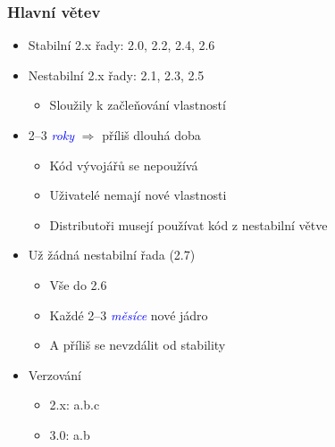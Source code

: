 \documentclass[xcolor=dvipsnames,handout]{beamer}
\let\Oldemph\emph
\renewcommand{\emph}[1]{\textcolor{blue}{\Oldemph{#1}}}
\begin{document}
\begin{frame}
  \frametitle{Hlavní větev}

  \begin{itemize}
    \item Stabilní 2.x řady: 2.0, 2.2, 2.4, 2.6
    \item Nestabilní 2.x řady: 2.1, 2.3, 2.5
    \begin{itemize}
      \item Sloužily k začleňování vlastností
    \end{itemize}

    \pause

    \item 2--3 \emph{roky} $\Rightarrow$ příliš dlouhá doba
    \begin{itemize}
      \item Kód vývojářů se nepoužívá
      \item Uživatelé nemají nové vlastnosti
      \item Distributoři musejí používat kód z nestabilní větve
    \end{itemize}

    \pause

    \item Už žádná nestabilní řada (2.7)
    \begin{itemize}
      \item Vše do 2.6
      \item Každé 2--3 \emph{měsíce} nové jádro

      \pause

      \item A příliš se nevzdálit od stability
    \end{itemize}

    \pause

    \item Verzování
    \begin{itemize}
      \item 2.x: a.b.c
      \item 3.0: a.b
    \end{itemize}
  \end{itemize}

\end{frame}
\end{document}
